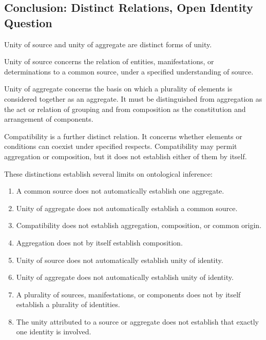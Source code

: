
\subsection{Conclusion: Distinct Relations, Open Identity Question}

Unity of source and unity of aggregate
are distinct forms of unity.

Unity of source concerns the relation
of entities, manifestations, or
determinations to a common source,
under a specified understanding of
source.

Unity of aggregate concerns the basis
on which a plurality of elements is
considered together as an aggregate.
It must be distinguished from aggregation
as the act or relation of grouping
and from composition as the constitution
and arrangement of components.

Compatibility is a further distinct
relation. It concerns whether elements
or conditions can coexist under
specified respects. Compatibility
may permit aggregation or composition,
but it does not establish either
of them by itself.

These distinctions establish several
limits on ontological inference:

\begin{enumerate}
    \item A common source does not
    automatically establish one aggregate.

    \item Unity of aggregate does not
    automatically establish a common source.

    \item Compatibility does not establish
    aggregation, composition, or common origin.

    \item Aggregation does not by itself
    establish composition.

    \item Unity of source does not
    automatically establish unity
    of identity.

    \item Unity of aggregate does not
    automatically establish unity
    of identity.

    \item A plurality of sources,
    manifestations, or components
    does not by itself establish
    a plurality of identities.

    \item The unity attributed to a source
    or aggregate does not establish
    that exactly one identity is involved.
\end{enumerate}

